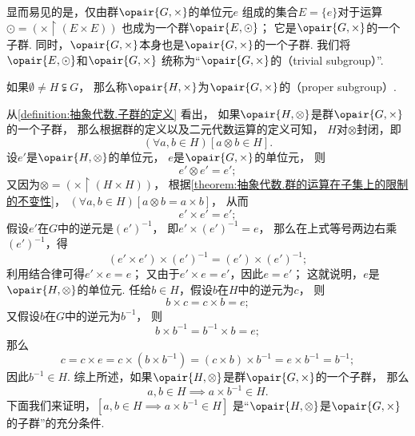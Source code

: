 显而易见的是，仅由群\(\opair{G,\times}\)的单位元\(e\)%
组成的集合\(E=\{e\}\)对于运算\(\odot=(\times\upharpoonright(E\times E))\)%
也成为一个群\(\opair{E,\odot}\)；
它是\(\opair{G,\times}\)的一个子群.
同时，\(\opair{G,\times}\)本身也是\(\opair{G,\times}\)的一个子群.
我们将\(\opair{E,\odot}\)和\(\opair{G,\times}\)%
统称为“\(\opair{G,\times}\)的（trivial subgroup）”.

如果\(\emptyset \neq H \subsetneqq G\)，
那么称\(\opair{H,\times}\)为\(\opair{G,\times}\)的（proper subgroup）.

从\cref{definition:抽象代数.子群的定义} 看出，
如果\(\opair{H,\otimes}\)是群\(\opair{G,\times}\)的一个子群，
那么根据群的定义以及二元代数运算的定义可知，
\(H\)对\(\otimes\)封闭，即\[
	(\forall a,b \in H)[a \otimes b \in H].
\]
设\(e'\)是\(\opair{H,\otimes}\)的单位元，
\(e\)是\(\opair{G,\times}\)的单位元，
则\[
	e' \otimes e' = e';
\]
又因为\(\otimes = (\times \upharpoonright(H \times H))\)，
根据\cref{theorem:抽象代数.群的运算在子集上的限制的不变性}，
\((\forall a,b \in H)[a \otimes b = a \times b]\)，
从而\[
	e' \times e' = e';
\]
假设\(e'\)在\(G\)中的逆元是\((e')^{-1}\)，
即\(e' \times (e')^{-1} = e\)，
那么在上式等号两边右乘\((e')^{-1}\)，得\[
	(e' \times e') \times (e')^{-1} = (e') \times (e')^{-1};
\]
利用结合律可得\(e' \times e = e\)；
又由于\(e' \times e = e'\)，因此\(e = e'\)；
这就说明，\(e\)是\(\opair{H,\otimes}\)的单位元.
任给\(b \in H\)，假设\(b\)在\(H\)中的逆元为\(c\)，
则\[
	b \times c = c \times b = e;
\]
又假设\(b\)在\(G\)中的逆元为\(b^{-1}\)，
则\[
	b \times b^{-1} = b^{-1} \times b = e;
\]
那么\[
	c = c \times e
	= c \times (b \times b^{-1})
	= (c \times b) \times b^{-1}
	= e \times b^{-1}
	= b^{-1};
\]
因此\(b^{-1} \in H\).
综上所述，如果\(\opair{H,\otimes}\)是群\(\opair{G,\times}\)的一个子群，
那么\[
	a,b \in H
	\implies
	a \times b^{-1} \in H.
\]
下面我们来证明，\([a,b \in H \implies a \times b^{-1} \in H]\)
是“\(\opair{H,\otimes}\)是\(\opair{G,\times}\)的子群”的充分条件.
